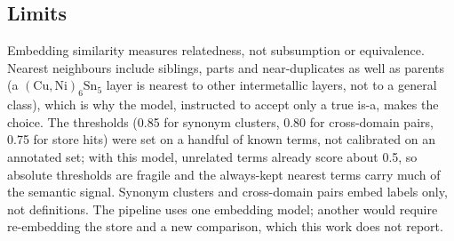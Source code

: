 
\subsection{Limits}

Embedding similarity measures relatedness, not subsumption or equivalence. Nearest neighbours include siblings, parts and near-duplicates as well as parents (a $(\mathrm{Cu,Ni})_6\mathrm{Sn}_5$ layer is nearest to other intermetallic layers, not to a general class), which is why the model, instructed to accept only a true is-a, makes the choice. The thresholds (0.85 for synonym clusters, 0.80 for cross-domain pairs, 0.75 for store hits) were set on a handful of known terms, not calibrated on an annotated set; with this model, unrelated terms already score about 0.5, so absolute thresholds are fragile and the always-kept nearest terms carry much of the semantic signal. %
Synonym clusters and cross-domain pairs embed labels only, not definitions. The pipeline uses one embedding model; another would require re-embedding the store and a new comparison, which this work does not report.
